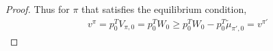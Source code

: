 \documentclass[]{article}
\newtheorem{proof}{Proof}
\begin{document}
\begin{proof}
Thus for $\pi$ that satisfies the equilibrium condition,
\begin{align}
v^\pi  = p_0^TV_{\pi,0} = p_0^TW_0 \geq p_0^TW_0 - p_0^T\tilde{\mu}_{\pi',0} = v^{\pi'}
\end{align}

\end{proof}
\end{document}
